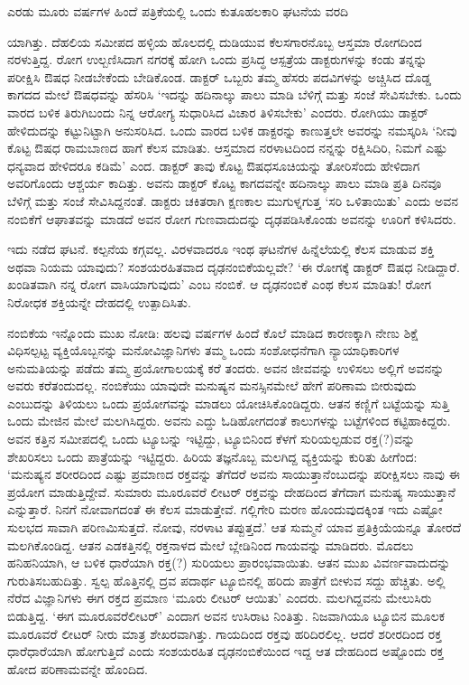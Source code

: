 
{\parfillskip=0pt ಎರಡು ಮೂರು ವರ್ಷಗಳ ಹಿಂದೆ ಪತ್ರಿಕೆಯಲ್ಲಿ ಒಂದು ಕುತೂಹಲಕಾರಿ ಘಟನೆಯ ವರದಿ\-\par}\newpage\noindent ಯಾಗಿತ್ತು. ದೆಹಲಿಯ ಸಮೀಪದ ಹಳ್ಳಿಯ ಹೊಲದಲ್ಲಿ ದುಡಿಯುವ ಕೆಲಸಗಾರನೊಬ್ಬ ಆಸ್ತಮಾ ರೋಗದಿಂದ ನರಳುತ್ತಿದ್ದ. ರೋಗ ಉಲ್ಬಣಿಸಿದಾಗ ನಗರಕ್ಕೆ ಹೋಗಿ ಒಂದು ಪ್ರಸಿದ್ಧ ಆಸ್ಪತ್ರೆಯ ಡಾಕ್ಟರುಗಳನ್ನು ಕಂಡು ತನ್ನನ್ನು ಪರೀಕ್ಷಿಸಿ ಔಷಧ ನೀಡಬೇಕೆಂದು ಬೇಡಿಕೊಂಡ. ಡಾಕ್ಟರ್ ಒಬ್ಬರು ತಮ್ಮ ಹೆಸರು ಪದವಿಗಳನ್ನು ಅಚ್ಚಿಸಿದ ದೊಡ್ಡ ಕಾಗದದ ಮೇಲೆ ಔಷಧವನ್ನು ಹೆಸರಿಸಿ ‘ಇದನ್ನು ಹದಿನಾಲ್ಕು ಪಾಲು ಮಾಡಿ ಬೆಳಿಗ್ಗೆ ಮತ್ತು ಸಂಜೆ ಸೇವಿಸಬೇಕು. ಒಂದು ವಾರದ ಬಳಿಕ ತಿರುಗಿಬಂದು ನಿನ್ನ ಆರೋಗ್ಯ ಸುಧಾರಿಸಿದ ವಿಚಾರ ತಿಳಿಸಬೇಕು’ ಎಂದರು. ರೋಗಿಯು ಡಾಕ್ಟರ್ ಹೇಳಿದುದನ್ನು ಕಟ್ಟುನಿಟ್ಟಾಗಿ ಅನುಸರಿಸಿದ. ಒಂದು ವಾರದ ಬಳಿಕ ಡಾಕ್ಟರನ್ನು ಕಾಣುತ್ತಲೇ ಅವರನ್ನು ನಮಸ್ಕರಿಸಿ ‘ನೀವು ಕೊಟ್ಟ ಔಷಧ ರಾಮಬಾಣದ ಹಾಗೆ ಕೆಲಸ ಮಾಡಿತು. ಆಸ್ತಮಾದ ನರಳಾಟದಿಂದ ನನ್ನನ್ನು ರಕ್ಷಿಸಿದಿರಿ, ನಿಮಗೆ ಎಷ್ಟು ಧನ್ಯವಾದ ಹೇಳಿದರೂ ಕಡಿಮೆ’ ಎಂದ. ಡಾಕ್ಟರ್ ತಾವು ಕೊಟ್ಟ ಔಷಧಸೂಚಿಯನ್ನು ತೋರಿಸೆಂದು ಹೇಳಿದಾಗ ಅವರಿಗೊಂದು ಆಶ್ಚರ್ಯ ಕಾದಿತ್ತು. ಅವನು ಡಾಕ್ಟರ್ ಕೊಟ್ಟ ಕಾಗದವನ್ನೇ ಹದಿನಾಲ್ಕು ಪಾಲು ಮಾಡಿ ಪ್ರತಿ ದಿನವೂ ಬೆಳಿಗ್ಗೆ ಮತ್ತು ಸಂಜೆ ಸೇವಿಸಿದ್ದನಂತೆ. ಡಾಕ್ಟರು ಚಕಿತರಾಗಿ ಕ್ಷಣಕಾಲ ಮುಗುಳ್ನಗುತ್ತ ‘ಸರಿ ಒಳಿತಾಯಿತು’ ಎಂದು ಅವನ ನಂಬಿಕೆಗೆ ಆಘಾತವನ್ನು ಮಾಡದೆ ಅವನ ರೋಗ ಗುಣವಾದುದನ್ನು ದೃಢಪಡಿಸಿಕೊಂಡು ಅವನನ್ನು ಊರಿಗೆ ಕಳಿಸಿದರು.

ಇದು ನಡೆದ ಘಟನೆ. ಕಲ್ಪನೆಯ ಕಗ್ಗವಲ್ಲ. ವಿರಳವಾದರೂ ಇಂಥ ಘಟನೆಗಳ ಹಿನ್ನೆಲೆಯಲ್ಲಿ ಕೆಲಸ ಮಾಡುವ ಶಕ್ತಿ ಅಥವಾ ನಿಯಮ ಯಾವುದು? ಸಂಶಯರಹಿತವಾದ ದೃಢನಂಬಿಕೆಯಲ್ಲವೇ? ‘ಈ ರೋಗಕ್ಕೆ ಡಾಕ್ಟರ್ ಔಷಧ ನೀಡಿದ್ದಾರೆ. ಖಂಡಿತವಾಗಿ ನನ್ನ ರೋಗ ವಾಸಿಯಾಗುವುದು’ ಎಂಬ ನಂಬಿಕೆ. ಆ ದೃಢನಂಬಿಕೆ ಎಂಥ ಕೆಲಸ ಮಾಡಿತು! ರೋಗ ನಿರೋಧಕ ಶಕ್ತಿಯನ್ನೇ ದೇಹದಲ್ಲಿ ಉತ್ಪಾದಿಸಿತು.

ನಂಬಿಕೆಯ ಇನ್ನೊಂದು ಮುಖ ನೋಡಿ: ಹಲವು ವರ್ಷಗಳ ಹಿಂದೆ ಕೊಲೆ ಮಾಡಿದ ಕಾರಣಕ್ಕಾಗಿ ನೇಣು ಶಿಕ್ಷೆ ವಿಧಿಸಲ್ಪಟ್ಟ ವ್ಯಕ್ತಿಯೊಬ್ಬನನ್ನು ಮನೋವಿಜ್ಞಾನಿಗಳು ತಮ್ಮ ಒಂದು ಸಂಶೋಧನೆಗಾಗಿ ನ್ಯಾಯಾಧಿಕಾರಿಗಳ ಅನುಮತಿಯನ್ನು ಪಡೆದು ತಮ್ಮ ಪ್ರಯೋಗಾಲಯಕ್ಕೆ ಕರೆ ತಂದರು. ಅವನ ಜೀವವನ್ನು ಉಳಿಸಲು ಅಲ್ಲಿಗೆ ಅವನನ್ನು ಅವರು ಕರೆತಂದುದಲ್ಲ. ನಂಬಿಕೆಯು ಯಾವುದೇ ಮನುಷ್ಯನ ಮನಸ್ಸಿನಮೇಲೆ ಹೇಗೆ ಪರಿಣಾಮ ಬೀರುವುದು ಎಂಬುದನ್ನು ತಿಳಿಯಲು ಒಂದು ಪ್ರಯೋಗವನ್ನು ಮಾಡಲು ಯೋಚಿಸಿಕೊಂಡಿದ್ದರು. ಆತನ ಕಣ್ಣಿಗೆ ಬಟ್ಟೆಯನ್ನು ಸುತ್ತಿ ಒಂದು ಮೇಜಿನ ಮೇಲೆ ಮಲಗಿಸಿದ್ದರು. ಅವನು ಎದ್ದು ಓಡಿಹೋಗದಂತೆ ಕಾಲುಗಳನ್ನು ಬಟ್ಟೆಗಳಿಂದ ಕಟ್ಟಿಹಾಕಿದ್ದರು. ಅವನ ಕತ್ತಿನ ಸಮೀಪದಲ್ಲಿ ಒಂದು ಟ್ಯೂಬನ್ನು ಇಟ್ಟಿದ್ದು, ಟ್ಯೂಬಿನಿಂದ ಕೆಳಗೆ ಸುರಿಯಲ್ಪಡುವ ರಕ್ತ(?)ವನ್ನು ಶೇಖರಿಸಲು ಒಂದು ಪಾತ್ರೆಯನ್ನು ಇಟ್ಟಿದ್ದರು. ಹಿರಿಯ ತಜ್ಞನೊಬ್ಬ ಮಲಗಿದ್ದ ವ್ಯಕ್ತಿಯನ್ನು ಕುರಿತು ಹೀಗೆಂದ: ‘ಮನುಷ್ಯನ ಶರೀರದಿಂದ ಎಷ್ಟು ಪ್ರಮಾಣದ ರಕ್ತವನ್ನು ತೆಗೆದರೆ ಅವನು ಸಾಯುತ್ತಾನೆಂಬುದನ್ನು ಪರೀಕ್ಷಿಸಲು ನಾವು ಈ ಪ್ರಯೋಗ ಮಾಡುತ್ತಿದ್ದೇವೆ. ಸುಮಾರು ಮೂರೂವರೆ ಲೀಟರ್ ರಕ್ತವನ್ನು ದೇಹದಿಂದ ತೆಗೆದಾಗ ಮನುಷ್ಯ ಸಾಯುತ್ತಾನೆ ಎನ್ನುತ್ತಾರೆ. ನಿನಗೆ ನೋವಾಗದಂತೆ ಈ ಕೆಲಸ ಮಾಡುತ್ತೇವೆ. ಗಲ್ಲಿಗೇರಿ ಮರಣ ಹೊಂದುವುದಕ್ಕಿಂತ ಇದು ಎಷ್ಟೋ ಸುಲಭದ ಸಾವಾಗಿ ಪರಿಣಮಿಸುತ್ತದೆ. ನೋವು, ನರಳಾಟ ತಪ್ಪುತ್ತದೆ.’ ಆತ ಸುಮ್ಮನೆ ಯಾವ ಪ್ರತಿಕ್ರಿಯೆಯನ್ನೂ ತೋರದೆ ಮಲಗಿಕೊಂಡಿದ್ದ. ಆತನ ಎಡಕತ್ತಿನಲ್ಲಿ ರಕ್ತನಾಳದ ಮೇಲೆ ಬ್ಲೇಡಿನಿಂದ ಗಾಯವನ್ನು ಮಾಡಿದರು. ಮೊದಲು ಹನಿಹನಿಯಾಗಿ, ಆ ಬಳಿಕ ಧಾರೆಯಾಗಿ ರಕ್ತ(?) ಸುರಿಯಲು ಪ್ರಾರಂಭವಾಯಿತು. ಆತನ ಮುಖ ವಿವರ್ಣವಾದುದನ್ನು ಗುರುತಿಸಬಹುದಿತ್ತು. ಸ್ವಲ್ಪ ಹೊತ್ತಿನಲ್ಲಿ ದ್ರವ ಪದಾರ್ಥ ಟ್ಯೂಬಿನಲ್ಲಿ ಹರಿದು ಪಾತ್ರೆಗೆ ಬೀಳುವ ಸದ್ದು ಹೆಚ್ಚಿತು. ಅಲ್ಲಿ ನೆರೆದ ವಿಜ್ಞಾನಿಗಳು ಈಗ ರಕ್ತದ ಪ್ರಮಾಣ ‘ಮೂರು ಲೀಟರ್ ಆಯಿತು’ ಎಂದರು. ಮಲಗಿದ್ದವನು ಮೇಲುಸಿರು ಬಿಡುತ್ತಿದ್ದ. ‘ಈಗ ಮೂರೂವರೆಲೀಟರ್​’ ಎಂದಾಗ ಅವನ ಉಸಿರಾಟ ನಿಂತಿತ್ತು. ನಿಜವಾಗಿಯೂ ಟ್ಯೂಬಿನ ಮೂಲಕ ಮೂರೂವರೆ ಲೀಟರ್ ನೀರು ಮಾತ್ರ ಶೇಖರವಾಗಿತ್ತು. ಗಾಯದಿಂದ ರಕ್ತವು ಹರಿದಿರಲಿಲ್ಲ. ಆದರೆ ಶರೀರದಿಂದ ರಕ್ತ ಧಾರೆಧಾರೆಯಾಗಿ ಹೋಗುತ್ತಿದೆ ಎಂದು ಸಂಶಯರಹಿತ ದೃಢನಂಬಿಕೆಯಿಂದ ಇದ್ದ ಆತ ದೇಹದಿಂದ ಅಷ್ಟೊಂದು ರಕ್ತ ಹೋದ ಪರಿಣಾಮವನ್ನೇ ಹೊಂದಿದ.



